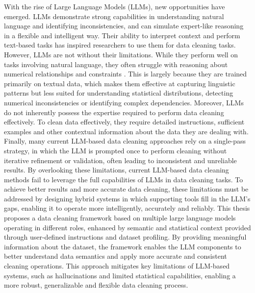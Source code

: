 With the rise of Large Language Models (LLMs), new opportunities have emerged. 
LLMs demonstrate strong capabilities in understanding natural language and identifying inconsistencies, and can simulate expert-like reasoning in a flexible and intelligent way. 
Their ability to interpret context and perform text-based tasks has inspired researchers to use them for data cleaning tasks. 
However, LLMs are not without their limitations. 
While they perform well on tasks involving natural language, they often struggle with reasoning about numerical relationships and constraints \cite{PAPER5}. 
This is largely because they are trained primarily on textual data, which makes them effective at capturing linguistic patterns but less suited for understanding statistical distributions, detecting numerical inconsistencies or identifying complex dependencies.
Moreover, LLMs do not inherently possess the expertise required to perform data cleaning effectively. 
To clean data effectively, they require detailed instructions, sufficient examples and other contextual information about the data they are dealing with. 
Finally, many current LLM-based data cleaning approaches rely on a single-pass strategy, in which the LLM is prompted once to perform cleaning without iterative refinement or validation, often leading to inconsistent and unreliable results.
By overlooking these limitations, current LLM-based data cleaning methods fail to leverage the full capabilities of LLMs in data cleaning tasks. 
To achieve better results and more accurate data cleaning, these limitations must be addressed by designing hybrid systems in which supporting tools fill in the LLM's gaps, enabling it to operate more intelligently, accurately and reliably.
\newline\newline
This thesis proposes a data cleaning framework based on multiple large language models operating in different roles, enhanced by semantic and statistical context provided through user-defined instructions and dataset profiling.
By providing meaningful information about the dataset, the framework enables the LLM components to better understand data semantics and apply more accurate and consistent cleaning operations.
This approach mitigates key limitations of LLM-based systems, such as hallucinations and limited statistical capabilities, enabling a more robust, generalizable and flexible data cleaning process.

